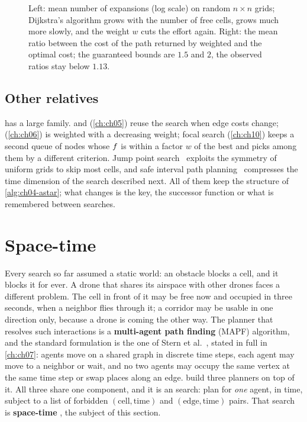 \begin{figure}[tb]
  \centering
  \caption{Left: mean number of expansions (log scale) on random $n \times n$
  grids; Dijkstra's algorithm grows with the number of free cells, \astar grows
  much more slowly, and the weight $w$ cuts the effort again. Right: the mean
  ratio between the cost of the path returned by weighted \astar and the
  optimal cost; the guaranteed bounds are $1.5$ and $2$, the observed ratios
  stay below $1.13$.}
  \label{fig:ch04-expansions}
\end{figure}

\subsection{Other relatives}
\label{sec:ch04-relatives}

\astar has a large family. \lpastar and \dstarlite (\cref{ch:ch05}) reuse the
search when edge costs change; \arastar (\cref{ch:ch06}) is weighted \astar
with a decreasing weight; focal search (\cref{ch:ch10}) keeps a second queue
of nodes whose $f$ is within a factor $w$ of the best and picks among
them by a different criterion. Jump point search~\cite{harabor2011jps}
exploits the symmetry of uniform grids to skip most cells, and safe interval
path planning~\cite{phillips2011sipp} compresses the time dimension of the
search described next. All of them keep the structure of
\cref{alg:ch04-astar}; what changes is the key, the successor function or
what is remembered between searches.

\section{Space-time \astar}
\label{sec:ch04-spacetime}

Every search so far assumed a static world: an obstacle blocks a cell, and it
blocks it for ever. A drone that shares its airspace with other drones faces a
different problem. The cell in front of it may be free now and occupied in three
seconds, when a neighbor flies through it; a corridor may be usable in one
direction only, because a drone is coming the other way. The planner that
resolves such interactions is a \textbf{multi-agent path finding}
(MAPF) algorithm, and the standard
formulation is the one of Stern et al.~\cite{stern2019mapf}, stated in full in
\cref{ch:ch07}: agents move on a shared graph in discrete time steps, each agent
may move to a neighbor or wait, and no two agents may occupy the same vertex at
the same time step or swap places along an edge.
 build three planners on top of it. All three share one component, and it is an \astar search:
plan for \emph{one} agent, in time, subject to a list of forbidden
$(\text{cell}, \text{time})$ and $(\text{edge}, \text{time})$ pairs. That search
is \textbf{space-time \astar}, the
subject of this section.

